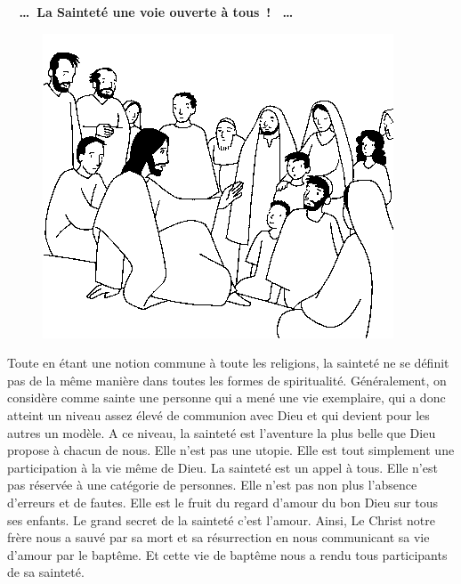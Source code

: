  \begin{center}
 \textbf{
\og 
\dots \og La Sainteté une voie ouverte à tous ! \fg{} \dots
 \fg{}
 }
 \end{center}

\begin{figure}
\vspace{-0.2cm}
	\includegraphics[scale=0.75]{../images/jesus_parle_foule}
\end{figure}
 Toute en étant une notion commune à toute les religions, la sainteté ne se définit pas de la même manière dans toutes les formes de spiritualité. Généralement, on considère comme sainte une personne qui a mené une vie exemplaire, qui a donc atteint un niveau assez élevé de communion avec Dieu et qui devient pour les autres un modèle. A ce niveau, la sainteté est l’aventure la plus belle que Dieu propose à chacun de nous. Elle n’est pas une utopie. Elle est tout simplement une participation à la vie même de Dieu. La sainteté est un appel à tous. Elle n’est pas réservée à une catégorie de personnes. Elle n’est pas non plus l’absence d’erreurs et de fautes. Elle est le fruit du regard d’amour du bon Dieu sur tous ses enfants. Le grand secret de la sainteté c’est l’amour. Ainsi, Le Christ notre frère nous a sauvé par sa mort et sa résurrection en nous communicant sa vie d’amour par le baptême. Et cette vie de baptême nous a rendu tous participants de sa sainteté.

